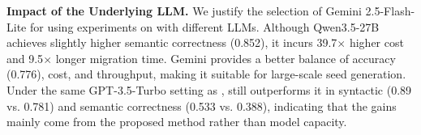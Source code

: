 \documentclass[conference]{IEEEtran}
\begin{document}
\textbf{Impact of the Underlying LLM.}
We justify the selection of Gemini 2.5-Flash-Lite for \tool{} using experiments on \monetdb{} with different LLMs. Although Qwen3.5-27B achieves slightly higher semantic correctness (0.852), it incurs 39.7$\times$ higher cost and 9.5$\times$ longer migration time. Gemini provides a better balance of accuracy (0.776), cost, and throughput, making it suitable for large-scale seed generation.
Under the same GPT-3.5-Turbo setting as \sedar{}, \tool{} still outperforms it in syntactic (0.89 vs. 0.781) and semantic correctness (0.533 vs. 0.388), indicating that the gains mainly come from the proposed method rather than model capacity.

\end{document}
